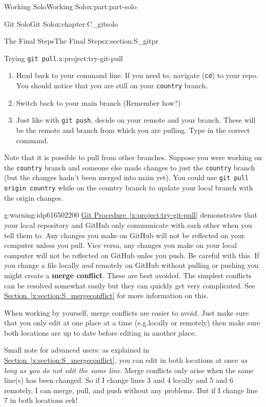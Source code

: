 \documentclass[oneside,10pt,]{book}
\newcommand{\xreffont}{\relax}
\newcommand{\mono}[1]{\texttt{#1}}
\newcommand{\terminology}[1]{\textbf{#1}}
\begin{document}
\begin{partptx}{Working Solo}{}{Working Solo}{}{}{x:part:part-solo}
\begin{chapterptx}{Git Solo}{}{Git Solo}{}{}{x:chapter:C_gitsolo}
\begin{sectionptx}{The Final Steps}{}{The Final Steps}{}{}{x:section:S_gitpr}
\begin{project}{Trying \mono{git pull}.}{x:project:try-git-pull}
\begin{enumerate}[font=\bfseries,label=(\alph*),ref=\alph*]
\item{}Head back to your command line. If you need to, navigate (\mono{cd}) to your repo. You should notice that you are still on your \mono{country} branch.%
\item{}Switch back to your main branch (Remember how?)%
\item{}Just like with \mono{git push}, decide on your remote and your branch. These will be the remote and branch from which you are pulling. Type in the correct command.%
\end{enumerate}
Note that it is possible to pull from other branches. Suppose you were working on the \mono{country} branch and someone else made changes to just the \mono{country} branch (but the changes hadn't been merged into main yet). You could use \mono{git pull origin country} while on the country branch to update your local branch with the origin changes.%
\end{project}%
\begin{warning}{}{g:warning:idp616502200}%
%
\hyperref[x:project:try-git-pull]{Git Procedure~{\xreffont\ref{x:project:try-git-pull}}} demonstrates that your local repository and GitHub only communicate with each other when you tell them to. Any changes you make on GitHub will not be reflected on your computer unless you pull. Vice versa, any changes you make on your local computer will not be reflected on GitHub unles you push. Be careful with this. If you change a file locally \emph{and} remotely on GitHub without pulling or pushing you might create a \terminology{merge conflict}. These are best avoided. The simplest conflicts can be resolved somewhat easily but they can quickly get very complicated. See \hyperref[x:section:S_mergeconflict]{Section~{\xreffont\ref{x:section:S_mergeconflict}}} for more information on this.%
\par
When working by yourself, merge conflicts are easier to avoid. Just make sure that you only edit at one place at a time (e.g.\@ locally or remotely) then make sure both locations are up to date before editing in another place.%
\par
Small note for advanced users: as explained in \hyperref[x:section:S_mergeconflict]{Section~{\xreffont\ref{x:section:S_mergeconflict}}}, you can edit in both locations at once \emph{as long as you do not edit the same line}. Merge conflicts only arise when the same line(s) has been changed. So if I change lines 3 and 4 locally and 5 and 6 remotely, I can merge, pull, and push without any problems. But if I change line 7 in both locations \textellipsis{} eek!%

\end{warning}
\end{sectionptx}
\end{chapterptx}
\end{partptx}
\end{document}

